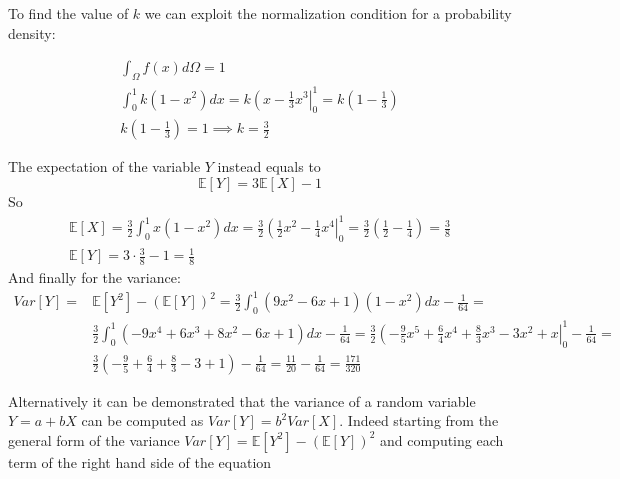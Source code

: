 \cprotEnv\begin{solution}
	\label{ex:variance}
To find the value of $k$ we can exploit the normalization condition for a probability density:

\begin{equation*}
	\begin{gathered}
\int_\Omega f(x) d\Omega = 1\\
\int_{0}^{1}k(1-x^{2})dx = k\left(x-\frac{1}{3}x^{3}\right|_{0}^{1}= k\left(1-\frac{1}{3}\right) \\
k\left(1-\frac{1}{3}\right) = 1 \implies k = \frac{3}{2}
	\end{gathered}
\end{equation*}

The expectation of the variable $Y$ instead equals to
\begin{equation*}
\mathbb{E}[Y] = 3\mathbb{E}[X] - 1
\end{equation*}	
So
\begin{equation*}
	\begin{gathered}
\mathbb{E}[X] = \frac{3}{2}\int_{0}^{1}x(1-x^2)dx = \frac{3}{2}\left(\frac{1}{2}x^2-\frac{1}{4}x^{4}\right|_{0}^{1} = \frac{3}{2}\left(\frac{1}{2}-\frac{1}{4}\right) = \frac{3}{8} \\
\mathbb{E}[Y] = 3\cdot\frac{3}{8} - 1 = \frac{1}{8} 
\end{gathered}
\end{equation*}
And finally for the variance:
\begin{equation*}
	\begin{aligned}
Var[Y] = & \mathbb{E}[Y^2] - (\mathbb{E}[Y])^2 = \frac{3}{2}\int_{0}^{1}(9x^2 - 6x + 1)(1-x^2)dx - \frac{1}{64} = \\  &\frac{3}{2}\int_{0}^{1}(- 9x^4 + 6x^3 + 8x^2 - 6x + 1)dx - \frac{1}{64} = 
\frac{3}{2}\left(- \frac{9}{5}x^5 + \frac{6}{4}x^4 + \frac{8}{3}x^3 - 3x^2 + x\right|_{0}^{1} - \frac{1}{64} = \\
& \frac{3}{2}\left(- \frac{9}{5} + \frac{6}{4} + \frac{8}{3} - 3 + 1\right) - \frac{1}{64} = \frac{11}{20} - \frac{1}{64} = \frac{171}{320}
\end{aligned}
\end{equation*}

Alternatively it can be demonstrated that the variance of a random variable $Y = a + bX$ can be computed as $Var[Y] = b^2 Var[X]$. Indeed starting from the general form of the variance $Var[Y] = \mathbb{E}[Y^2] - (\mathbb{E}[Y])^2$ and computing each term of the right hand side of the equation 


\end{solution}
